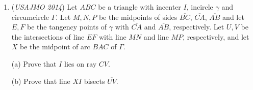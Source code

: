 \begin{enumerate}
 

	\item (\textit{USAJMO 2014}) Let $ABC$ be a triangle with incenter $I$, incircle $\gamma$ and circumcircle $\Gamma$.  Let $M,N,P$ be the midpoints of sides $\overline{BC}$, $\overline{CA}$, $\overline{AB}$ and let $E,F$ be the tangency points of $\gamma$ with $\overline{CA}$ and $\overline{AB}$, respectively.  Let $U,V$ be the intersections of line $EF$ with line $MN$ and line $MP$, respectively, and let $X$ be the midpoint of arc $BAC$ of $\Gamma$.


 (a) Prove that $I$ lies on ray $CV$.


 (b) Prove that line $XI$ bisects $\overline{UV}$.


 

\end{enumerate}